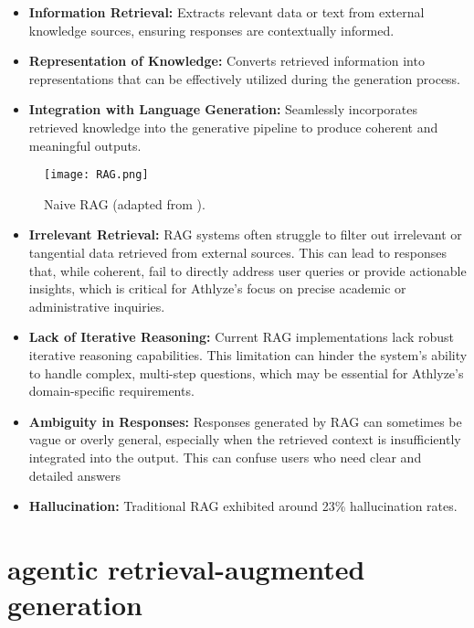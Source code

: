 \documentclass[conference]{IEEEtran}
\begin{document}
\begin{itemize}
\item \textbf{Information Retrieval:} Extracts relevant data or text from external knowledge sources, ensuring responses are contextually informed.
\item \textbf{Representation of Knowledge:} Converts retrieved information into representations that can be effectively utilized during the generation process.
\item \textbf{Integration with Language Generation:} Seamlessly incorporates retrieved knowledge into the generative pipeline to produce coherent and meaningful outputs.\\
\end{itemize}

\begin{figure}[h!]
    \centering
    \texttt{[image: RAG.png]}
    \caption{Naive RAG (adapted from \cite{12}).}
    \label{fig:RAG}
\end{figure}


\begin{itemize}
\item \textbf{Irrelevant Retrieval:} RAG systems often struggle to filter out irrelevant or tangential data retrieved from external sources. This can lead to responses that, while coherent, fail to directly address user queries or provide actionable insights, which is critical for Athlyze's focus on precise academic or administrative inquiries.
\item \textbf{Lack of Iterative Reasoning:} Current RAG implementations lack robust iterative reasoning capabilities. This limitation can hinder the system's ability to handle complex, multi-step questions, which may be essential for Athlyze's domain-specific requirements.
\item \textbf{Ambiguity in Responses:} Responses generated by RAG can sometimes be vague or overly general, especially when the retrieved context is insufficiently integrated into the output. This can confuse users who need clear and detailed answers
\item \textbf{Hallucination:} Traditional RAG exhibited around 23\% hallucination rates.\\

\end{itemize}

\section{agentic retrieval-augmented generation}
\end{document}

